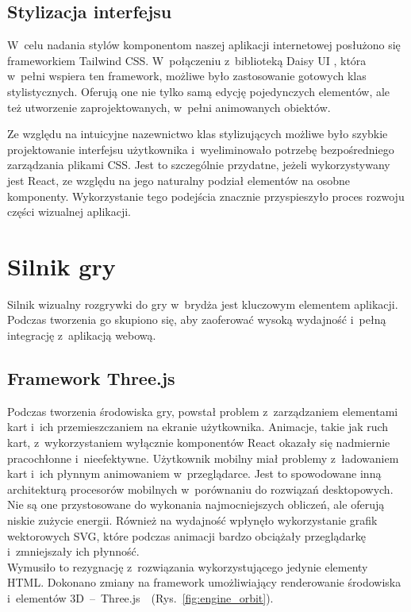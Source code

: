\subsection{Stylizacja interfejsu}
W~celu nadania stylów komponentom naszej aplikacji internetowej posłużono się
frameworkiem Tailwind CSS. W~połączeniu z~biblioteką Daisy UI
\cite{DaisyUI}, która
w~pełni wspiera ten framework, możliwe było zastosowanie gotowych klas
stylistycznych. Oferują one nie tylko samą edycję pojedynczych elementów, ale też
utworzenie zaprojektowanych, w~pełni animowanych obiektów.

Ze względu na intuicyjne nazewnictwo klas stylizujących możliwe było szybkie
projektowanie interfejsu użytkownika i~wyeliminowało
potrzebę bezpośredniego zarządzania plikami CSS. Jest to szczególnie
przydatne, jeżeli wykorzystywany jest React, ze względu na jego naturalny podział
elementów na osobne komponenty. Wykorzystanie tego podejścia znacznie przyspieszyło
proces rozwoju części wizualnej aplikacji.


\section{Silnik gry}
\label{subsec:silnik_gry}

Silnik wizualny rozgrywki do gry w~brydża jest kluczowym elementem aplikacji.
Podczas tworzenia go skupiono się, aby zaoferować
wysoką wydajność i~pełną integrację z~aplikacją webową.


\subsection{Framework Three.js}

Podczas tworzenia środowiska gry, powstał problem z~zarządzaniem
elementami kart i~ich przemieszczaniem na ekranie użytkownika. Animacje,
takie jak ruch kart, z~wykorzystaniem wyłącznie komponentów React
okazały się nadmiernie pracochłonne i~nieefektywne. Użytkownik
mobilny miał problemy z~ładowaniem kart
i~ich płynnym animowaniem w~przeglądarce. Jest to spowodowane inną architekturą procesorów
mobilnych w~porównaniu do rozwiązań desktopowych. Nie są one przystosowane
do wykonania najmocniejszych obliczeń, ale oferują niskie zużycie energii.
Również na wydajność wpłynęło wykorzystanie grafik wektorowych SVG,
które podczas animacji bardzo obciążały przeglądarkę i~zmniejszały
ich płynność. \\

Wymusiło to rezygnację z~rozwiązania wykorzystującego jedynie elementy HTML.
Dokonano zmiany na framework umożliwiający renderowanie
środowiska i~elementów
\mbox{3D -- Three.js~\cite{ThreeJS}~(Rys.~\ref{fig:engine_orbit})}.


